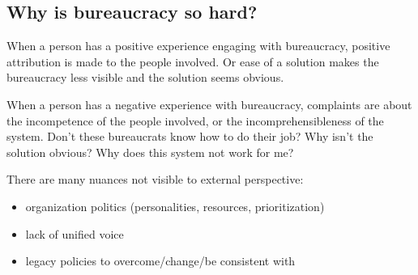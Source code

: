 \subsection{Why is bureaucracy so hard?}

When a person has a positive experience engaging with bureaucracy, positive attribution is made to the people involved. Or ease of a solution makes the bureaucracy less visible and the solution seems obvious. 

When a person has a negative experience with bureaucracy, complaints are about the incompetence of the people involved, or the incomprehensibleness of the system. Don't these bureaucrats know how to do their job? Why isn't the solution obvious? Why does this system not work for me?

There are many nuances not visible to external perspective:
\begin{itemize}
    \item organization politics (personalities, resources, prioritization)
\item lack of unified voice
\item legacy policies to overcome/change/be consistent with
\end{itemize}



